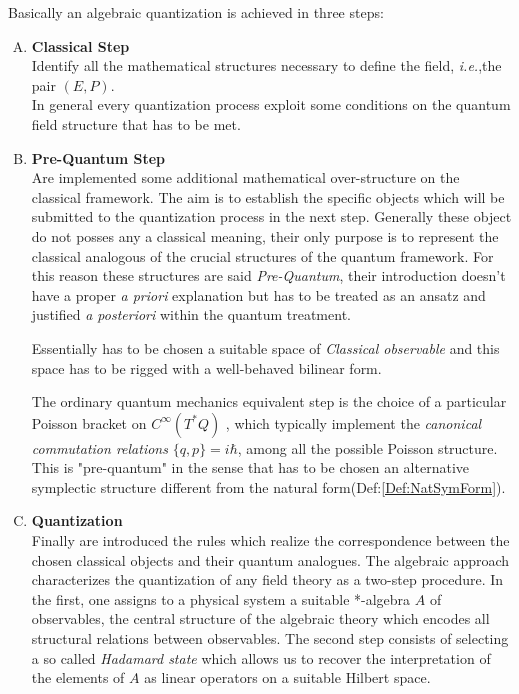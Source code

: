 \documentclass[Main]{subfiles}
\begin{document}
Basically an algebraic quantization is achieved in three steps:
\begin{enumerate}[A)]
	\item \textbf{Classical Step}\\
		Identify all the mathematical structures necessary to define the field, \textit{i.e.},the pair $(E,P)$.\\
		In general every quantization process exploit some conditions on the quantum field structure that has to be met.
	\item \textbf{Pre-Quantum Step}\\
		Are implemented %
		some additional mathematical over-structure  on the classical framework. The aim is to establish the specific objects which will be submitted to the quantization process in the next step. 
		Generally these object do not posses any a classical meaning, their only purpose is to represent the classical analogous of the crucial structures of the quantum framework. 
		For this reason these structures are said \emph{Pre-Quantum}, their introduction doesn't have a proper \emph{a priori} explanation but has to be treated as an ansatz and justified \emph{a posteriori} within the quantum treatment.
		
		Essentially has to be chosen a suitable space of \emph{Classical observable} and this space has to be rigged with a well-behaved bilinear form.
		
		The ordinary quantum mechanics equivalent step is the choice of a particular Poisson bracket on $C^\infty(T^*Q)$ , which typically implement the \emph{canonical commutation relations} $\{q,p\}=i\hbar$, among all the possible Poisson structure. 
		This is "pre-quantum" in the sense that has to be chosen an alternative symplectic structure different from the natural form(Def:\ref{Def:NatSymForm}).
		
		
	\item \textbf{Quantization}\\
		Finally are introduced the rules which realize the correspondence between the chosen classical objects and their quantum analogues.
		The algebraic approach characterizes the quantization of any field theory as a two-step procedure. 
		In the first, one assigns to a physical system a suitable *-algebra $A$ of observables, the central structure of the algebraic theory which encodes all structural relations between observables. 
		The second step consists of selecting a so called \emph{Hadamard state} which allows us to recover the interpretation of the elements of $A$ as linear operators on a suitable Hilbert space.
\end{enumerate}
\end{document}
